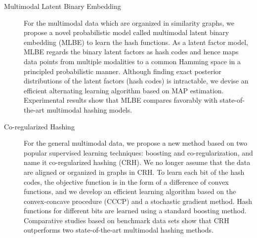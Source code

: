 \begin{description}
\item[Multimodal Latent Binary Embedding] For the multimodal data which are organized in similarity graphs, we propose a novel probabilistic model called multimodal latent binary embedding (MLBE) to learn the hash functions. As a latent factor model, MLBE regards the binary latent factors as hash codes and hence maps data points from multiple modalities to a common Hamming space in a principled probabilistic manner. Although finding exact posterior distributions of the latent factors (hash codes) is intractable, we devise an efficient alternating learning algorithm based on \mbox{MAP} estimation. Experimental results show that MLBE compares favorably with state-of-the-art multimodal hashing models. %

\item[Co-regularized Hashing] For the general multimodal data, we propose a new method based on two popular supervised learning techniques: boosting and co-regularization, and name it co-regularized hashing (CRH). We no longer assume that the data are aligned or organized in graphs in CRH. To learn each bit of the hash codes, the objective function is in the form of a difference of convex functions, and we develop an efficient learning algorithm based on the convex-concave procedure (\mbox{CCCP}) and a stochastic gradient method. Hash functions for different bits are learned using a standard boosting method. Comparative studies based on benchmark data sets show that \mbox{CRH} outperforms two state-of-the-art multimodal hashing methods.
\end{description}
%
%
%

